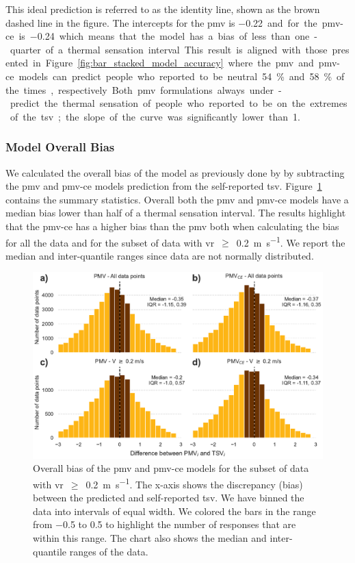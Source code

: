 This ideal prediction is referred to as the identity line, shown as the brown dashed line in the figure.
The intercepts for the \ac{pmv} is \qty{-0.22} and for the \ac{pmv-ce} is \qty{-0.24} which means that the model has a bias of less than one-quarter of a thermal sensation interval.
This result is aligned with those presented in Figure~\ref{fig:bar_stacked_model_accuracy} where the \ac{pmv} and \ac{pmv-ce} models can predict people who reported to be neutral \qty{54}{\percent} and \qty{58}{\percent} of the times, respectively.
Both \ac{pmv} formulations always under-predict the thermal sensation of people who reported to be on the extremes of the \ac{tsv};
the slope of the curve was significantly lower than 1.

\subsubsection{Model Overall Bias}\label{subsubsec:model-overall-bias}
We calculated the overall bias of the model as previously done by  by subtracting the \ac{pmv} and \ac{pmv-ce} models prediction from the self-reported \ac{tsv}.
Figure~\ref{fig:hist_discrepancies} contains the summary statistics.
Overall both the \ac{pmv} and \ac{pmv-ce} models have a median bias lower than half of a thermal sensation interval.
The results highlight that the \ac{pmv-ce} has a higher bias than the \ac{pmv} both when calculating the bias for all the data and for the subset of data with \ac{vr}~$\geq$~\qty{0.2}{\m\per\s}.
We report the median and inter-quantile ranges since data are not normally distributed.
\begin{figure}[htb!]
    \centering
    \includegraphics[width=\textwidth]{figures/hist_discrepancies}
    \caption{Overall bias of the \ac{pmv} and \ac{pmv-ce} models for the subset of data with \ac{vr}~$\geq$~\qty{0.2}{\m\per\s}.
    The x-axis shows the discrepancy (bias) between the predicted and self-reported \ac{tsv}.
    We have binned the data into intervals of equal width.
    We colored the bars in the range from \num{-.5} to \num{.5} to highlight the number of responses that are within this range.
    The chart also shows the median and inter-quantile ranges of the data.
    }
    \label{fig:hist_discrepancies}
\end{figure}
